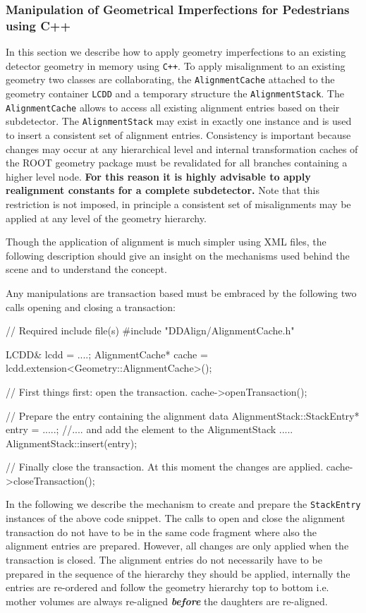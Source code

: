 \documentclass[10pt,a4paper]{article}
\begin{document}
\noindent
\subsubsection{Manipulation of Geometrical Imperfections for Pedestrians using C++}
\label{sec:ddalign-user-manual-misalignment-manip-cxx}
\noindent
In this section we describe how to apply geometry imperfections to an existing 
detector geometry in memory using {\tt C++}. To apply misalignment to an existing
geometry two classes are collaborating, the {\tt AlignmentCache} attached to
the geometry container {\tt LCDD} and a temporary structure the {\tt AlignmentStack}.
The {\tt AlignmentCache} allows to access all existing alignment entries 
based on their subdetector.
The {\tt AlignmentStack} may exist in exactly one instance and is used to
insert a consistent set of alignment entries. Consistency is important because
changes may occur at any hierarchical level and internal transformation caches
of the ROOT geometry package must be revalidated for all branches containing
a higher level node.
{\bf For this reason it is highly advisable to apply realignment constants 
for a complete subdetector.}
Note that this restriction is not imposed, in principle a consistent set 
of misalignments may be applied at any level of the geometry hierarchy.

\noindent
Though the application of alignment is much simpler using XML files, the following
description should give an insight on the mechanisms used behind the scene and
to understand the concept.

\noindent
Any manipulations are transaction based must be embraced by the following two calls
opening and closing a transaction:
\begin{code}
// Required include file(s)
#include "DDAlign/AlignmentCache.h"

    LCDD& lcdd = ....;
    AlignmentCache* cache = lcdd.extension<Geometry::AlignmentCache>();

    // First things first: open the transaction.
    cache->openTransaction();

    // Prepare the entry containing the alignment data
    AlignmentStack::StackEntry* entry =  .....;
    //.... and add the element to the AlignmentStack .....
    AlignmentStack::insert(entry);

    // Finally close the transaction. At this moment the changes are applied.
    cache->closeTransaction();
\end{code}
In the following we describe the mechanism to create and prepare the 
{\tt StackEntry} instances of the above code snippet. The calls to open and close
the alignment transaction do not have to be in the same code fragment where also
the alignment entries are prepared. However, all changes are only applied when 
the transaction is closed. The alignment entries do not necessarily have to 
be prepared in the sequence of the hierarchy they should be applied, internally
the entries are re-ordered and follow the geometry hierarchy top to bottom
i.e. mother volumes are always re-aligned {\it\bf before} the daughters 
are re-aligned.
\end{document}
